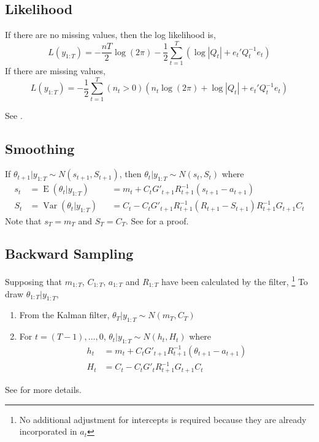 \documentclass{article}\usepackage[]{graphicx}\usepackage[]{color}
\DeclareMathOperator{\E}{E}
\DeclareMathOperator{\Var}{Var}
\begin{document}
\subsection{Likelihood}
\label{sec:likelihood}

If there are no missing values, then the log likelihood is,
\begin{equation}
  L(y_{1:T}) =  - \frac{n T}{2} \log (2 \pi) - \frac{1}{2} \sum_{t=1}^{T}
  \left(
    \log | Q_{t} | + e_{t}' Q_{t}^{-1} e_{t}
  \right)
\end{equation}
If there are missing values,
\begin{equation}
  L(y_{1:T}) = 
  -\frac{1}{2} \sum_{t=1}^{T} 
  (n_{t} > 0) 
  \left(
    n_{t} \log (2 \pi)
    + \log | Q_{t} | + e_{t}' Q_{t}^{-1} e_{t}
  \right)
\end{equation}

See \textcite[Chapter 5, p. 57]{KoopmanShephardDoornik2008}.


\subsection{Smoothing}
\label{sec:smoothing}

If $\theta_{t+1} | y_{1:T} \sim N(s_{t+1}, S_{t+1})$, then $\theta_{t} | y_{1:T} \sim N(s_{t}, S_{t})$ where
\begin{align}
  s_{t} &= \E(\theta_{t} | y_{1:T}) &&= m_{t} + C_{t} G'_{t+1} R_{t+1}^{-1}(s_{t+1} - a_{t+1}) \\
  S_{t} &= \Var(\theta_{t} | y_{1:T}) &&= C_{t} - C_{t} G'_{t+1} R^{-1}_{t+1} (R_{t+1} - S_{t+1}) R^{-1}_{t+1} G_{t+1} C_{t}
\end{align}
Note that $s_{T} = m_{T}$ and $S_{T} = C_{T}$.
See \textcite[Prop 2.4, p. 61]{PetrisPetroneEtAl2009} for a proof.


\subsection{Backward Sampling}
\label{sec:backward-sample}

Supposing that $m_{1:T}$, $C_{1:T}$, $a_{1:T}$ and $R_{1:T}$ have been calculated by the filter,%
\footnote{No additional adjustment for intercepts is required because they are already incorporated in $a_{t}$}
To draw $\theta_{1:T} | y_{1:T}$,

\begin{enumerate}
\item From the Kalman filter, $\theta_{T} | y_{1:T} \sim N(m_{T}, C_{T})$
\item For $t = (T-1), \dots, 0$, $\theta_{t} | y_{1:T} \sim N(h_{t}, H_{t})$ where
  \begin{align}
    h_{t} &= m_{t} + C_{t} G'_{t + 1} R_{t+1}^{-1}(\theta_{t+1} - a_{t+1}) \\
    H_{t} &= C_{t} - C_{t} G'_{t} R_{t+1}^{-1} G_{t+1} C_{t}
  \end{align}
\end{enumerate}
See \textcite[Chapter 4.4.1, p. 161]{PetrisPetroneEtAl2009} for more details.
\end{document}
